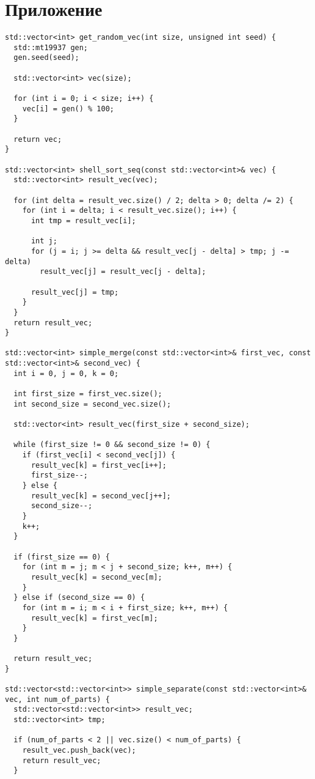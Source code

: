 \documentclass{article}
\begin{document}
\section{Приложение}
\begin{verbatim}
std::vector<int> get_random_vec(int size, unsigned int seed) {
  std::mt19937 gen;
  gen.seed(seed);

  std::vector<int> vec(size);

  for (int i = 0; i < size; i++) {
    vec[i] = gen() % 100;
  }

  return vec;
}

std::vector<int> shell_sort_seq(const std::vector<int>& vec) {
  std::vector<int> result_vec(vec);

  for (int delta = result_vec.size() / 2; delta > 0; delta /= 2) {
    for (int i = delta; i < result_vec.size(); i++) {
      int tmp = result_vec[i];

      int j;
      for (j = i; j >= delta && result_vec[j - delta] > tmp; j -= delta)
        result_vec[j] = result_vec[j - delta];

      result_vec[j] = tmp;
    }
  }
  return result_vec;
}

std::vector<int> simple_merge(const std::vector<int>& first_vec, const std::vector<int>& second_vec) {
  int i = 0, j = 0, k = 0;

  int first_size = first_vec.size();
  int second_size = second_vec.size();

  std::vector<int> result_vec(first_size + second_size);

  while (first_size != 0 && second_size != 0) {
    if (first_vec[i] < second_vec[j]) {
      result_vec[k] = first_vec[i++];
      first_size--;
    } else {
      result_vec[k] = second_vec[j++];
      second_size--;
    }
    k++;
  }

  if (first_size == 0) {
    for (int m = j; m < j + second_size; k++, m++) {
      result_vec[k] = second_vec[m];
    }
  } else if (second_size == 0) {
    for (int m = i; m < i + first_size; k++, m++) {
      result_vec[k] = first_vec[m];
    }
  }

  return result_vec;
}

std::vector<std::vector<int>> simple_separate(const std::vector<int>& vec, int num_of_parts) {
  std::vector<std::vector<int>> result_vec;
  std::vector<int> tmp;

  if (num_of_parts < 2 || vec.size() < num_of_parts) {
    result_vec.push_back(vec);
    return result_vec;
  }


\end{verbatim}
\end{document}
